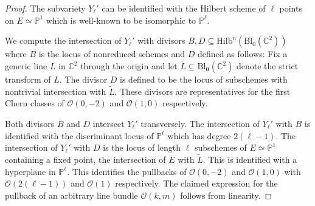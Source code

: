 \documentclass[12pt]{amsart}
\newcommand{\Hilb}{\mathrm{Hilb}}
\newcommand{\C}{\mathbb{C}}
\renewcommand{\P}{\mathbb{P}}
\newcommand{\CO}{\mathcal{O}}
\newcommand{\Bl}{\mathrm{Bl}}
\numberwithin{equation}{section}
\theoremstyle{definition}
\begin{document}
\begin{proof}
    The subvariety $Y_\ell'$ can be identified with the Hilbert scheme of $\ell$ points on $E\simeq \P^1$ which is well-known to be isomorphic to $\P^\ell$.
    
    We compute the intersection of $Y_\ell'$ with divisors $B,D\subseteq \Hilb^n(\Bl_0 (\C^2))$ where $B$ is the locus of nonreduced schemes and $D$ defined as follows: Fix a generic line $L$ in $\C^2$ through the origin and let $\widetilde{L}\subseteq \Bl_{\mathbf{0}}(\C^2)$ denote the strict transform of $L$. The divisor $D$ is defined to be the locus of subschemes with nontrivial intersection with $\widetilde{L}$. These divisors are representatives for the first Chern classes of $\CO(0,-2)$ and $\CO(1,0)$ respectively.
    
    Both divisors $B$ and $D$ intersect $Y_\ell'$ transversely. The intersection of $Y_\ell'$ with $B$ is identified with the discriminant locus of $\P^\ell$ which has degree $2(\ell-1)$. The intersection of $Y_\ell'$ with $D$ is the locus of length $\ell$ subschemes of $E\simeq \P^1$ containing a fixed point, the intersection of $E$ with $\widetilde{L}$. This is identified with a hyperplane in $\P^\ell$. This identifies the pullbacks of $\CO(0,-2)$ and $\CO(1,0)$ with $\CO(2(\ell-1))$ and $\CO(1)$ respectively. The claimed expression for the pullback of an arbitrary line bundle $\CO(k,m)$ follows from linearity.
\end{proof}
\end{document}
